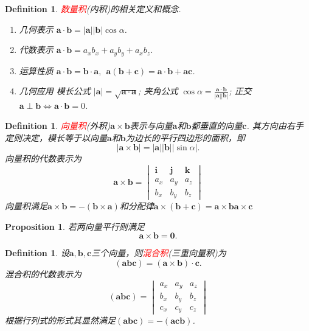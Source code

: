 \documentclass{article}
\newcommand{\mbf}[1]{\bm{#1}}
\newtheorem{proposition}[theorem]{Proposition}
\newtheorem{definition}[theorem]{Definition}
\newcommand{\redt}[1]{\textcolor{red}{#1}}
\begin{document}
\begin{definition}
\rm \redt{数量积}(内积)的相关定义和概念.
\begin{enumerate}
	\item 几何表示 $\mbf{a} \cdot \mbf{b} = |\mbf{a}| |\mbf{b}| \cos \alpha$.
	\item 代数表示 $\mbf{a} \cdot \mbf{b} = a_xb_x + a_yb_y + a_xb_z$.
	\item 运算性质 $\mbf{a} \cdot \mbf{b} = \mbf{b} \cdot \mbf{a},~~ \mbf{a}(\mbf{b} + \mbf{c}) = \mbf{a} \cdot \mbf{b} + \mbf{a}\mbf{c}$. 
	\item 几何应用 模长公式 $|\mbf{a}| = \sqrt{\mbf{a}\cdot\mbf{a}}$; 夹角公式 $\cos \alpha = \frac{\mbf{a}\cdot\mbf{b}}{|\mbf{a}||\mbf{b}|}$; 正交 $\mbf{a} \perp \mbf{b} \Leftrightarrow \mbf{a}\cdot\mbf{b} = 0$. 
\end{enumerate}
\end{definition}

\begin{definition}
\rm \redt{向量积}(外积)$\mbf{a}\times \mbf{b}$表示与向量$\mbf{a}$和$\mbf{b}$都垂直的向量$\mbf{c}$. 其方向由右手定则决定，模长等于以向量$\mbf{a}$和$\mbf{b}$为边长的平行四边形的面积，即
$$
|\mbf{a} \times \mbf{b}| = |\mbf{a}||\mbf{b}||\sin\alpha|. 
$$
向量积的代数表示为
$$
\mbf{a}\times\mbf{b} = \begin{vmatrix}
\mbf{i} & \mbf{j} & \mbf{k} \\
a_x & a_y & a_z \\
b_x & b_y & b_z 
\end{vmatrix}
$$
向量积满足$\mbf{a} \times \mbf{b} = - (\mbf{b} \times \mbf{a})$和分配律$\mbf{a} \times (\mbf{b}+\mbf{c}) = \mbf{a}\times\mbf{b} \mbf{a}\times\mbf{c}$
\end{definition}

\begin{proposition}
\rm 若两向量平行则满足
$$
\mbf{a} \times \mbf{b} = \mbf{0}.
$$
\end{proposition}

\begin{definition}
\rm 设$\mbf{a},\mbf{b},\mbf{c}$三个向量，则\redt{混合积}(三重向量积)为
$$
(\mbf{a}\mbf{b}\mbf{c}) = (\mbf{a} \times \mbf{b}) \cdot \mbf{c}. 
$$
混合积的代数表示为
$$
(\mbf{a}\mbf{b}\mbf{c}) = \begin{vmatrix}
a_x & a_y & a_z \\
b_x & b_y & b_z \\
c_x & c_y & c_z 
\end{vmatrix}
$$
根据行列式的形式其显然满足$(\mbf{a}\mbf{b}\mbf{c}) = -(\mbf{a}\mbf{c}\mbf{b})$. 
\end{definition}
\end{document}
